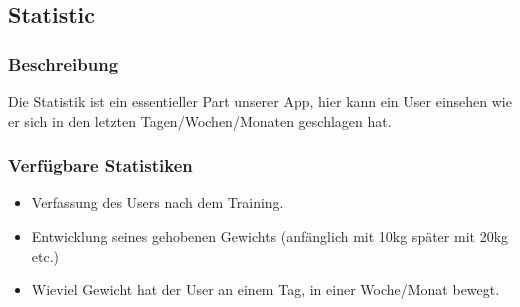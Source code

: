 \documentclass[FIPLY_base.tex]{subfiles}
\author{Gerald Irsiegler}
\date{26. Februar 2016}
\begin{document}
\subsection{Statistic}

\subsubsection{Beschreibung}
Die Statistik ist ein essentieller Part unserer App, hier kann ein User einsehen wie er sich in den letzten Tagen/Wochen/Monaten geschlagen hat.

\subsubsection{Verfügbare Statistiken}
\begin{itemize}
\item Verfassung des Users nach dem Training.
\item Entwicklung seines gehobenen Gewichts (anfänglich mit 10kg später mit 20kg etc.)
\item Wieviel Gewicht hat der User an einem Tag, in einer Woche/Monat bewegt.
\end{itemize}
\end{document}

